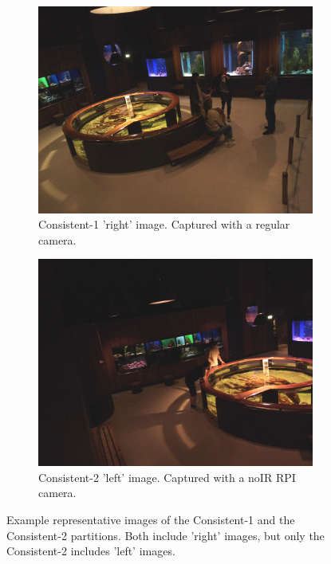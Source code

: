 \begin{figure}[H]
    \centering
    \begin{subfigure}{0.49\textwidth}
        \centering
        \includegraphics[width=\textwidth]{Images/DeviceImages/2nd-iteration/example.jpg}
        \caption[Consistent-1 'right' image]{Consistent-1 'right' image. Captured with a regular camera.}
    \end{subfigure}
    \hfill
    \begin{subfigure}{0.49\textwidth}
        \centering
        \includegraphics[width=\textwidth]{Images/DeviceImages/3rd/example.jpg}
        \caption[Consistent-2 'left' image (noIR)]{Consistent-2 'left' image. Captured with a noIR RPI camera.}
    \end{subfigure}
    \caption[Example representative images of the Consistent-1 and the Consistent-2 partitions.]{Example representative images of the Consistent-1 and the Consistent-2 partitions. Both include 'right' images, but only the Consistent-2 includes 'left' images.}
    \label{fig:consistent_datasets_differences}
\end{figure}

